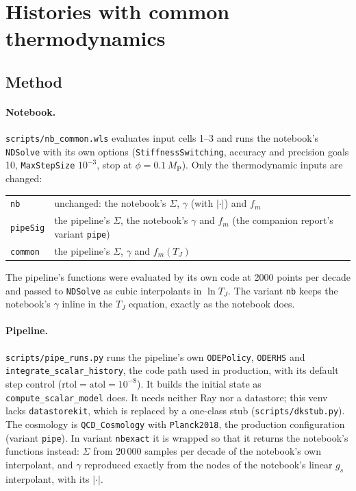 \documentclass[11pt,a4paper]{article}
\newcommand{\MP}{M_{\mathrm{P}}}
\newcommand{\TJ}{T_{J}}
\newcommand{\code}[1]{\texttt{#1}}
\begin{document}
\section{Histories with common thermodynamics}
\label{sec:runs}

\subsection{Method}

\paragraph{Notebook.} \code{scripts/nb\_common.wls} evaluates input cells 1--3 and runs the
notebook's \code{NDSolve} with its own options (\code{StiffnessSwitching}, accuracy and precision
goals 10, \code{MaxStepSize} $10^{-3}$, stop at $\phi = 0.1\,\MP$). Only the thermodynamic
inputs are changed:
\begin{center}\small
\begin{tabular}{@{}ll@{}}
\toprule
\code{nb} & unchanged: the notebook's $\Sigma$, $\gamma$ (with $|\cdot|$) and $f_m$ \\
\code{pipeSig} & the pipeline's $\Sigma$, the notebook's $\gamma$ and $f_m$ (the companion report's variant \code{pipe}) \\
\code{common} & the pipeline's $\Sigma$, $\gamma$ and $f_m(\TJ)$ \\
\bottomrule
\end{tabular}
\end{center}
The pipeline's functions were evaluated by its own code at 2000 points per decade and passed to
\code{NDSolve} as cubic interpolants in $\ln\TJ$. The variant \code{nb} keeps the notebook's
$\gamma$ inline in the $\TJ$ equation, exactly as the notebook does.

\paragraph{Pipeline.} \code{scripts/pipe\_runs.py} runs the pipeline's own \code{ODEPolicy},
\code{ODERHS} and \code{integrate\_scalar\_history}, the code path used in production, with
its default step control ($\mathrm{rtol} = \mathrm{atol} = 10^{-8}$). It builds the
initial state as \code{compute\_scalar\_model} does. It needs neither Ray nor a datastore; this
venv lacks \code{datastorekit}, which is replaced by a one-class stub (\code{scripts/dkstub.py}).
The cosmology is \code{QCD\_Cosmology} with \code{Planck2018}, the production configuration
(variant \code{pipe}). In variant \code{nbexact} it is wrapped so that it returns the
notebook's functions instead:
$\Sigma$ from 20\,000 samples per decade of the notebook's own interpolant, and $\gamma$
reproduced exactly from the nodes of the notebook's linear $g_s$ interpolant, with its
$|\cdot|$.
\end{document}
